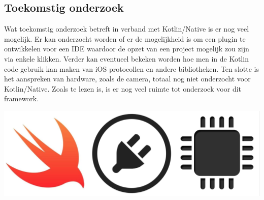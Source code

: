 \documentclass[a0,portrait]{a0poster}
\begin{document}
\begin{multicols}{2}
\section*{Toekomstig onderzoek}
\color{black}
Wat toekomstig onderzoek betreft in verband met Kotlin/Native is er nog veel mogelijk. Er kan onderzocht worden of er de mogelijkheid is om een plugin te ontwikkelen voor een IDE waardoor de opzet van een project mogelijk zou zijn via enkele klikken. Verder kan eventueel bekeken worden hoe men in de Kotlin code gebruik kan maken van iOS protocollen en andere bibliotheken. Ten slotte is het aanspreken van hardware, zoals de camera, totaal nog niet onderzocht voor Kotlin/Native. Zoals te lezen is, is er nog veel ruimte tot onderzoek voor dit framework.

\begin{center}\vspace{1cm}
	\includegraphics[width=1.0\linewidth]{figures/verder-onderzoek.png}
\end{center}\vspace{1cm}


\end{multicols}
\end{document}
